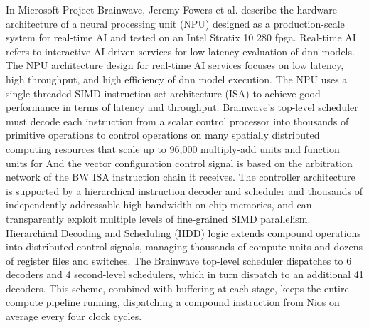 In Microsoft Project Brainwave\cite{Fowers2018}, Jeremy Fowers et al. describe the hardware architecture of a neural processing unit (NPU) designed as a production-scale system for real-time AI and tested on an Intel Stratix 10 280 \gls{fpga}. Real-time AI refers to interactive AI-driven services for low-latency evaluation of \gls{dnn}  models. The NPU architecture design for real-time AI services focuses on low latency, high throughput, and high efficiency of \gls{dnn} model execution. The NPU uses a single-threaded SIMD instruction set architecture (ISA) to achieve good performance in terms of latency and throughput. Brainwave's top-level scheduler must decode each instruction from a scalar control processor into thousands of primitive operations to control operations on many spatially distributed computing resources that scale up to 96,000 multiply-add units and function units for And the vector configuration control signal is based on the arbitration network of the BW ISA instruction chain it receives. The controller architecture is supported by a hierarchical instruction decoder and scheduler and thousands of independently addressable high-bandwidth on-chip memories, and can transparently exploit multiple levels of fine-grained SIMD parallelism. Hierarchical Decoding and Scheduling (HDD) logic extends compound operations into distributed control signals, managing thousands of compute units and dozens of register files and switches. The Brainwave top-level scheduler dispatches to 6 decoders and 4 second-level schedulers, which in turn dispatch to an additional 41 decoders. This scheme, combined with buffering at each stage, keeps the entire compute pipeline running, dispatching a compound instruction from Nios on average every four clock cycles.